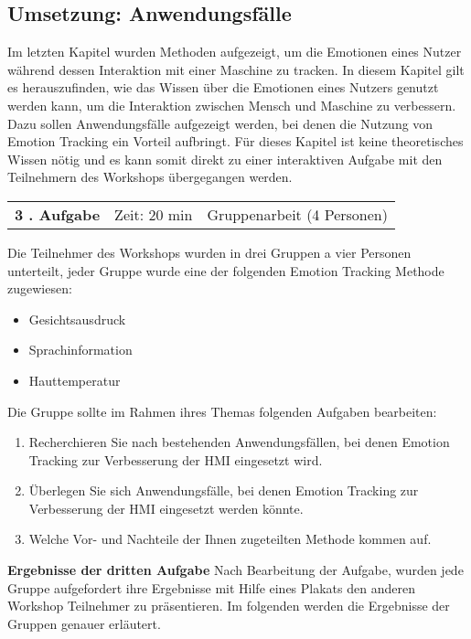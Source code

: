 \subsection{Umsetzung: Anwendungsfälle}\label{Umsetzung_Anwendungsfaelle}
Im letzten Kapitel wurden Methoden aufgezeigt, um die Emotionen eines Nutzer während dessen Interaktion mit einer Maschine zu tracken. In diesem Kapitel gilt es herauszufinden, wie das Wissen über die Emotionen eines Nutzers genutzt werden kann, um die Interaktion zwischen Mensch und Maschine zu verbessern. Dazu sollen Anwendungsfälle aufgezeigt werden, bei denen die Nutzung von Emotion Tracking ein Vorteil aufbringt. Für dieses Kapitel ist keine theoretisches Wissen nötig und es kann somit direkt zu einer interaktiven Aufgabe mit den Teilnehmern des Workshops übergegangen werden.
\newline

\begin{tabular}{c c c }
	\textbf{3 . Aufgabe} &  Zeit: 20 min & Gruppenarbeit (4 Personen)\\
\end{tabular}

Die Teilnehmer des Workshops wurden in drei Gruppen a vier Personen unterteilt, jeder Gruppe wurde eine der folgenden Emotion Tracking Methode zugewiesen:
\begin{itemize}
	\item Gesichtsausdruck
	\item Sprachinformation
	\item Hauttemperatur
\end{itemize}

Die Gruppe sollte im Rahmen ihres Themas folgenden Aufgaben bearbeiten:
	\begin{enumerate}
		\item Recherchieren Sie nach bestehenden Anwendungsfällen, bei denen Emotion Tracking zur Verbesserung der HMI eingesetzt wird.
		\item Überlegen Sie sich Anwendungsfälle, bei denen Emotion Tracking zur Verbesserung der HMI eingesetzt werden könnte.
		\item Welche Vor- und Nachteile der Ihnen zugeteilten Methode kommen auf.
	\end{enumerate}


\textbf{Ergebnisse der dritten Aufgabe} \newline
Nach Bearbeitung der Aufgabe, wurden jede Gruppe aufgefordert ihre Ergebnisse mit Hilfe eines Plakats den anderen Workshop Teilnehmer zu präsentieren. Im folgenden werden die Ergebnisse der Gruppen genauer erläutert.

